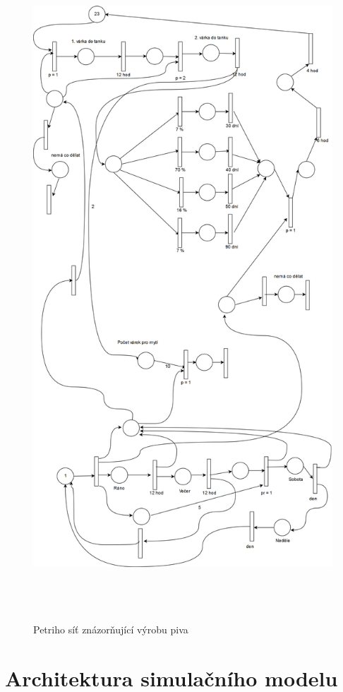 \documentclass[11pt,a4paper]{article}
\begin{document}
\begin{figure}[H]
  \centering
  \includegraphics[width=15cm, height=25cm]{petri.png}
  \caption{Petriho síť znázorňující výrobu piva}
  \label{fig:petri}
\end{figure}

\section{Architektura simulačního modelu}
\end{document}
